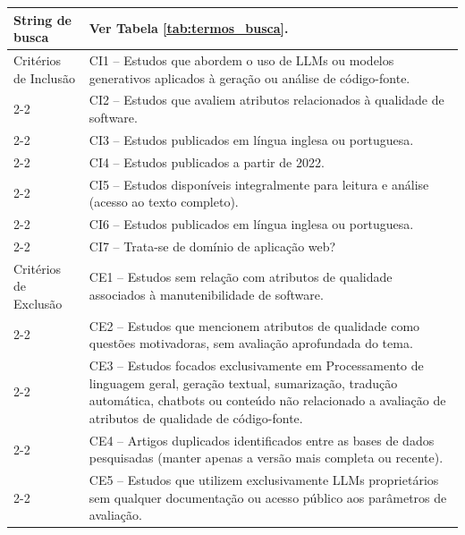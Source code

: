 \begin{longtable}{|p{3.5cm}|p{11cm}|}
String de busca & Ver Tabela \ref{tab:termos_busca}. \\ \hline

Critérios de Inclusão & CI1 -- Estudos que abordem o uso de LLMs ou modelos generativos aplicados à geração ou análise de código-fonte. \\ \cline{2-2}
 & CI2 -- Estudos que avaliem atributos relacionados à qualidade de software. \\ \cline{2-2}
 & CI3 -- Estudos publicados em língua inglesa ou portuguesa. \\ \cline{2-2}
 & CI4 -- Estudos publicados a partir de 2022. \\ \cline{2-2}
 & CI5 -- Estudos disponíveis integralmente para leitura e análise (acesso ao texto completo). \\ \cline{2-2}
 & CI6 -- Estudos publicados em língua inglesa ou portuguesa. \\ \cline{2-2}
 & CI7 -- Trata-se de domínio de aplicação web? \\ \hline

Critérios de Exclusão & CE1 -- Estudos sem relação com atributos de qualidade associados à manutenibilidade de software. \\ \cline{2-2}
 & CE2 -- Estudos que mencionem atributos de qualidade como questões motivadoras, sem avaliação aprofundada do tema. \\ \cline{2-2}
 & CE3 -- Estudos focados exclusivamente em Processamento de linguagem geral, geração textual, sumarização, tradução automática, chatbots ou conteúdo não relacionado a avaliação de atributos de qualidade de código-fonte. \\ \cline{2-2}
 & CE4 -- Artigos duplicados identificados entre as bases de dados pesquisadas (manter apenas a versão mais completa ou recente). \\ \cline{2-2}
 & CE5 -- Estudos que utilizem exclusivamente LLMs proprietários sem qualquer documentação ou acesso público aos parâmetros de avaliação. \\ \hline


\end{longtable}
